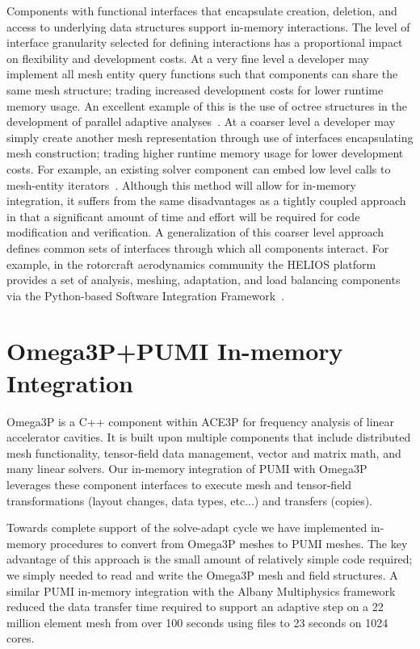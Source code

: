 \documentclass[a4paper]{article}
\begin{document}
Components with functional interfaces that encapsulate creation, deletion, and
access to underlying data structures support in-memory interactions.
The level of interface granularity selected for defining interactions has a
proportional impact on flexibility and development costs.
At a very fine level a developer may implement all mesh entity query functions such
that components can share the same mesh structure; trading increased development
costs for lower runtime memory usage.
An excellent example of this is the use of octree structures in the
development of parallel adaptive analyses~\cite{BursteddeWilcoxGhattas11}.
At a coarser level a developer may simply create another mesh
representation through use of interfaces encapsulating mesh construction;
trading higher runtime memory usage for lower development costs.
For example, an existing solver component can embed low level
calls to mesh-entity iterators~\cite{Ollivier10}.
Although this method will allow for in-memory integration, it suffers from the
same disadvantages as a tightly coupled approach in that a significant amount of
time and effort will be required for code modification and verification.
A generalization of this coarser level approach defines common sets of
interfaces through which all components interact.
For example, in the rotorcraft aerodynamics community the HELIOS platform
provides a set of analysis, meshing, adaptation, and load balancing components
via the Python-based Software Integration Framework~\cite{sankaran2010application}.

\section{Omega3P+PUMI In-memory Integration}\label{sec:omega-pumi}

Omega3P is a C++ component within ACE3P for frequency analysis of linear
accelerator cavities.
It is built upon multiple components that include distributed mesh
functionality, tensor-field data management, vector and matrix math, and many
linear solvers.
Our in-memory integration of PUMI with Omega3P leverages these component interfaces to
execute mesh and tensor-field transformations (layout changes, data types, etc...) and 
transfers (copies).

Towards complete support of the solve-adapt cycle we have implemented in-memory
procedures to convert from Omega3P meshes to PUMI meshes.
The key advantage of this approach is the small amount of relatively simple code
required; we simply needed to read and write the Omega3P mesh and field
structures.
A similar PUMI in-memory integration with the Albany Multiphysics
framework~\cite{salinger2013albany,Albany2015} reduced the data transfer time
required to support an adaptive step on a 22 million element mesh from over 100
seconds using files to 23 seconds on 1024 cores.
\end{document}
